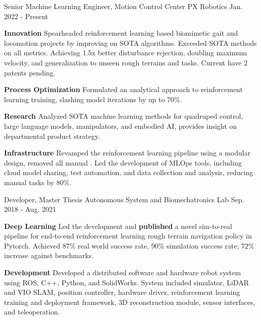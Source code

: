 \begin{cventries}
	\cventry
	{Senior Machine Learning Engineer, Motion Control Center}
	{PX Robotics}
	{Jan. 2022 - Present}
	{}
	{
		\begin{cvitems}
			\item {
				\textbf{Innovation} Spearheaded reinforcement learning based biomimetic gait and locomotion projects by improving on SOTA algorithms. Exceeded SOTA methods on all metrics. Achieving 1.5x better disturbance rejection, doubling maximum velocity, and generalization to unseen rough terrains and tasks. Current have 2 patents pending.
			}
			\item {
				\textbf{Process Optimization} Formulated an analytical approach to reinforcement learning training, slashing model iterations by up to 70\%.
			}
			\item {
				\textbf{Research} Analyzed SOTA machine learning methods for quadruped control, large language models, manipulators, and embodied AI, provides insight on departmental product strategy.
			}
			\item {
				\textbf{Infrastructure} Revamped the reinforcement learning pipeline using a modular design, removed all manual . Led the development of MLOps tools, including cloud model sharing, test automation, and data collection and analysis, reducing manual tasks by 80\%.
			}
		\end{cvitems}
	}
	\cventry
	{Developer, Master Thesis}
	{Autonomous System and Biomechatronics Lab}
	{Sep. 2018 - Aug. 2021}
	{}
	{
		\begin{cvitems}
			\item {
				\textbf{Deep Learning} Led the development and \textbf{published} a novel sim-to-real pipeline for end-to-end reinforcement learning rough terrain navigation policy in Pytorch. Achieved 87\% real world success rate, 90\% simulation success rate; 72\% increase against benchmarks.
			}
			\item {
				\textbf{Development} Developed a distributed software and hardware robot system using ROS, C++, Python, and SolidWorks. System included simulator, LiDAR and VIO SLAM, position controller, hardware driver, reinforcement learning training and deployment framework, 3D reconstruction module, sensor interfaces, and teleoperation.
}
\end{cvitems}}
\end{cventries}
